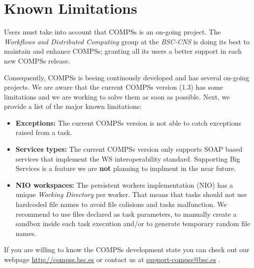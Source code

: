 \section{Known Limitations}
\label{sec:Known_Limitations}

Users must take into account that COMPSs is an on-going project. The \textit{Workflows and Distributed Computing} group 
at the \textit{BSC-CNS} is doing its best to maintain and enhance COMPSs; granting all its users a better support in
each new COMPSs release. 

Consequently, COMPSs is beeing continously developed and has several on-going projects. We are aware that the current COMPSs version
(1.3) has some limitations and we are working to solve them as soon as possible. Next, we provide a list of the major known
limitations: 
\begin{itemize}
 \item \textbf{Exceptions:} \newline The current COMPSs version is not able to catch exceptions raised from a task.
 
 \item \textbf{Services types:} \newline The current COMPSs version only supports SOAP based services that implement the WS interoperability
 standard. Supporting Big Services is a feature we are \textbf{not} planning to implment in the near future.
 
 \item \textbf{NIO workspaces:} \newline The persistent workers implementation (NIO) has a unique \textit{Working Directory} per worker. That
 means that tasks should not use hardcoded file names to avoid file colisions and tasks malfunction. We recommend to use files 
 declared as task parameters, to manually create a sandbox inside each task execution and/or to generate temporary random file names. 
\end{itemize}

If you are willing to know the COMPSs development state you can check out our webpage \url{http://compss.bsc.es} or 
contact us at \url{support-compss@bsc.es} .